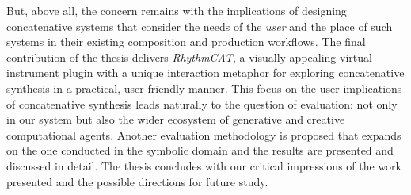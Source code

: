 But, above all, the concern remains with the implications of designing concatenative systems that consider the needs of the \textit{user} and the place of such systems in their existing composition and production workflows. The final contribution of the thesis delivers \textit{RhythmCAT}, a visually appealing virtual instrument plugin with a unique interaction metaphor for exploring concatenative synthesis in a practical, user-friendly manner. This focus on the user implications of concatenative synthesis leads naturally to the question of evaluation: not only in our system but also the wider ecosystem of generative and creative computational agents. Another evaluation methodology is proposed that expands on the one conducted in the symbolic domain and the results are presented and discussed in detail. The thesis concludes with our critical impressions of the work presented and the possible directions for future study.

